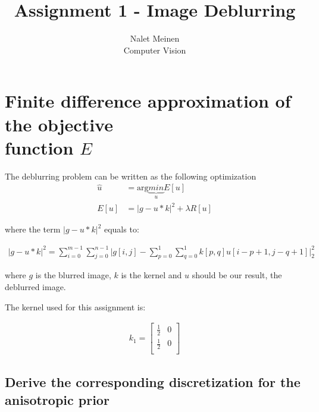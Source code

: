 \documentclass[12pt]{article}
\begin{document}


\title{Assignment 1 - Image Deblurring}%
\author{Nalet Meinen \\ %
Computer Vision
}

\maketitle

\section{Finite difference approximation of the objective \\
         function $E$}

The deblurring problem can be written as the following optimization
\begin{align}
    \hat{u} &= \mathrm{arg} \underbrace{min}_{u} E[u] \\
    E[u]    &= |g - u * k|^2 + \lambda R[u]
\end{align}

\noindent where the term $ |g - u * k|^2 $ equals to:

\begin{align}
    |g - u * k|^2 = \sum_{i=0}^{m-1} \sum_{j=0}^{n-1} \Big| g[i,j] - \sum_{p=0}^{1} \sum_{q=0}^{1} k[p,q] u[i-p + 1,j - q + 1] \Big|^2_2
\end{align}

\noindent where $g$ is the blurred image, $k$ is the kernel and $u$ should be our result, the deblurred image.

\noindent The kernel used for this assignment is:

\begin{align}
    k_1 =   \begin{bmatrix}
                \frac{1}{2} & 0 \\
                \frac{1}{2} & 0 \\
            \end{bmatrix}
\end{align}

\subsection{Derive the corresponding discretization for the anisotropic prior}
\end{document}
